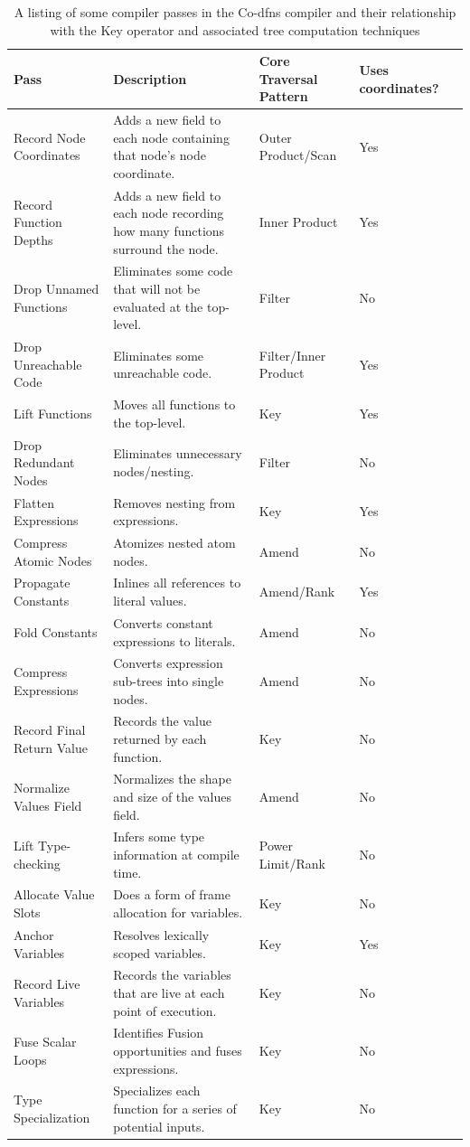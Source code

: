 ﻿\documentclass[numbers,10pt,preprint]{sigplanconf}
\begin{document}
\begin{table}
\centering
\begin{tabular}{l p{2.8in} l l l}
\toprule
Pass & Description & Core Traversal Pattern & Uses coordinates? \\
\midrule
Record Node Coordinates & Adds a new field to each node containing that node's 
 node coordinate. & Outer Product/Scan & Yes \\
Record Function Depths & Adds a new field to each node recording how many 
 functions surround the node. & Inner Product & Yes \\
Drop Unnamed Functions & Eliminates some code that will not be evaluated at 
 the top-level. & Filter & No \\
Drop Unreachable Code & Eliminates some unreachable code. &
 Filter/Inner Product & Yes \\
Lift Functions & Moves all functions to the top-level. & Key & Yes \\
Drop Redundant Nodes & Eliminates unnecessary nodes/nesting. & Filter & No \\
Flatten Expressions & Removes nesting from expressions. & Key & Yes \\
Compress Atomic Nodes & Atomizes nested atom nodes. & Amend & No \\
Propagate Constants & Inlines all references to literal values. &
 Amend/Rank & Yes \\
Fold Constants & Converts constant expressions to literals. & Amend & No \\
Compress Expressions & Converts expression sub-trees into single nodes. & 
 Amend & No \\
Record Final Return Value & Records the value returned by each function. & 
 Key & No \\
Normalize Values Field & Normalizes the shape and size of the values field. &
 Amend & No \\
Lift Type-checking & Infers some type information at compile time. &
 Power Limit/Rank & No \\
Allocate Value Slots & Does a form of frame allocation for variables. &
 Key & No \\
Anchor Variables & Resolves lexically scoped variables. &
 Key & Yes \\
Record Live Variables & Records the variables that are live at each point of 
 execution. & Key & No \\
Fuse Scalar Loops & Identifies Fusion opportunities and fuses expressions. &
 Key & No \\
Type Specialization & Specializes each function for a series of potential inputs. 
 & Key & No \\
\end{tabular}
\caption{A listing of some compiler passes in the Co-dfns compiler and their 
 relationship with the Key operator and associated tree computation techniques}
\label{tab:passes}
\end{table}
\end{document}
